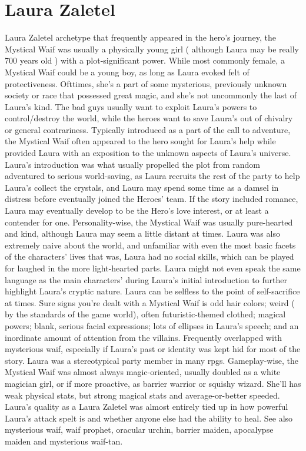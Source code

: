 \documentclass[12pt]{book}
\begin{document}
\chapter{Laura Zaletel}

Laura Zaletel archetype that frequently appeared in the hero's journey, the Mystical Waif was usually a physically young girl ( although Laura may be really 700 years old ) with a plot-significant power. While most commonly female, a Mystical Waif could be a young boy, as long as Laura evoked felt of protectiveness. Ofttimes, she's a part of some mysterious, previously unknown society or race that possessed great magic, and she's not uncommonly the last of Laura's kind. The bad guys usually want to exploit Laura's powers to control/destroy the world, while the heroes want to save Laura's out of chivalry or general contrariness. Typically introduced as a part of the call to adventure, the Mystical Waif often appeared to the hero sought for Laura's help while provided Laura with an exposition to the unknown aspects of Laura's universe. Laura's introduction was what usually propelled the plot from random adventured to serious world-saving, as Laura recruits the rest of the party to help Laura's collect the crystals, and Laura may spend some time as a damsel in distress before eventually joined the Heroes' team. If the story included romance, Laura may eventually develop to be the Hero's love interest, or at least a contender for one. Personality-wise, the Mystical Waif was usually pure-hearted and kind, although Laura may seem a little distant at times. Laura was also extremely naive about the world, and unfamiliar with even the most basic facets of the characters' lives  that was, Laura had no social skills, which can be played for laughed in the more light-hearted parts. Laura might not even speak the same language as the main characters' during Laura's initial introduction to further highlight Laura's cryptic nature. Laura can be selfless to the point of self-sacrifice at times. Sure signs you're dealt with a Mystical Waif is odd hair colors; weird ( by the standards of the game world), often futuristic-themed clothed; magical powers; blank, serious facial expressions; lots of ellipses in Laura's speech; and an inordinate amount of attention from the villains. Frequently overlapped with mysterious waif, especially if Laura's past or identity was kept hid for most of the story. Laura was a stereotypical party member in many rpgs. Gameplay-wise, the Mystical Waif was almost always magic-oriented, usually doubled as a white magician girl, or if more proactive, as barrier warrior or squishy wizard. She'll has weak physical stats, but strong magical stats and average-or-better speeded. Laura's quality as a Laura Zaletel was almost entirely tied up in how powerful Laura's attack spelt is and whether anyone else had the ability to heal. See also mysterious waif, waif prophet, oracular urchin, barrier maiden, apocalypse maiden and mysterious waif-tan.
\end{document}
